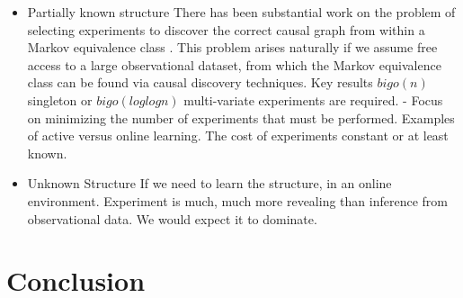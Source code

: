 \begin{itemize}

\item Partially known structure
There has been substantial work on the problem of selecting experiments to discover the correct causal graph from within a Markov equivalence class \cite{Eberhardt2005,eberhardt2010causal,hauser2014two,Hu2014}. This problem arises naturally if we assume free access to a large observational dataset, from which the Markov equivalence class can be found via causal discovery techniques. Key results $bigo(n)$ singleton or $bigo(log log n)$ multi-variate experiments are required.
- Focus on minimizing the number of experiments that must be performed. Examples of active versus online learning. The cost of experiments constant or at least known. 

\item Unknown Structure
If we need to learn the structure, in an online environment. 
Experiment is much, much more revealing than inference from observational data. We would expect it to dominate. 

\end{itemize}
\section{Conclusion}

